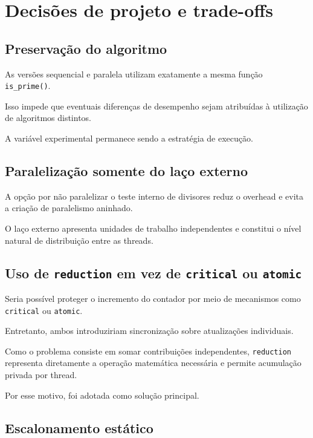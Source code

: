 \section{Decisões de projeto e trade-offs}
\label{sec:atvd05-decisoes}

\subsection{Preservação do algoritmo}

As versões sequencial e paralela utilizam exatamente a mesma função
\texttt{is\_prime()}.

Isso impede que eventuais diferenças de desempenho sejam atribuídas à
utilização de algoritmos distintos.

A variável experimental permanece sendo a estratégia de execução.


\subsection{Paralelização somente do laço externo}

A opção por não paralelizar o teste interno de divisores reduz o overhead e
evita a criação de paralelismo aninhado.

O laço externo apresenta unidades de trabalho independentes e constitui o
nível natural de distribuição entre as threads.


\subsection{Uso de \texttt{reduction} em vez de
\texttt{critical} ou \texttt{atomic}}

Seria possível proteger o incremento do contador por meio de mecanismos
como \texttt{critical} ou \texttt{atomic}.

Entretanto, ambos introduziriam sincronização sobre atualizações
individuais.

Como o problema consiste em somar contribuições independentes,
\texttt{reduction} representa diretamente a operação matemática necessária
e permite acumulação privada por thread.

Por esse motivo, foi adotada como solução principal.


\subsection{Escalonamento estático}

